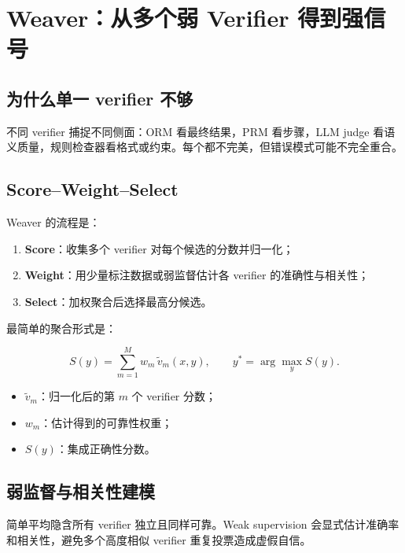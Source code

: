 \section{Weaver：从多个弱 Verifier 得到强信号}

\subsection{为什么单一 verifier 不够}

不同 verifier 捕捉不同侧面：ORM 看最终结果，PRM 看步骤，LLM judge 看语义质量，规则检查器看格式或约束。每个都不完美，但错误模式可能不完全重合。


\subsection{Score--Weight--Select}

Weaver 的流程是：

\begin{enumerate}
    \item \textbf{Score}：收集多个 verifier 对每个候选的分数并归一化；
    \item \textbf{Weight}：用少量标注数据或弱监督估计各 verifier 的准确性与相关性；
    \item \textbf{Select}：加权聚合后选择最高分候选。
\end{enumerate}


最简单的聚合形式是：

$$
S(y)=\sum_{m=1}^{M} w_m\,\tilde v_m(x,y),
\qquad
 y^*=\arg\max_y S(y).
$$

\begin{itemize}
    \item $\tilde v_m$：归一化后的第 $m$ 个 verifier 分数；
    \item $w_m$：估计得到的可靠性权重；
    \item $S(y)$：集成正确性分数。
\end{itemize}

\subsection{弱监督与相关性建模}

简单平均隐含所有 verifier 独立且同样可靠。Weak supervision 会显式估计准确率和相关性，避免多个高度相似 verifier 重复投票造成虚假自信。

